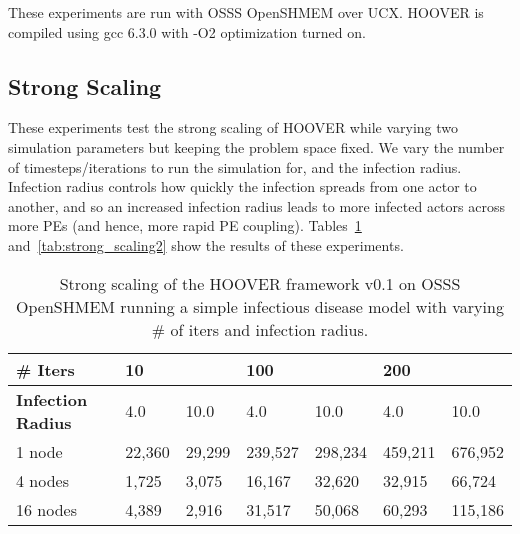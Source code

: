 These experiments are run with OSSS OpenSHMEM over UCX. HOOVER is compiled using
gcc 6.3.0 with -O2 optimization turned on.

\subsection{Strong Scaling}
\label{sec:strong_scaling}

These experiments test the strong scaling of HOOVER while varying two
simulation parameters but keeping the problem space fixed. We vary the number of
timesteps/iterations to run the simulation for, and the infection radius.
Infection radius controls how quickly the infection spreads from one actor to
another, and so an increased infection radius leads to more infected actors
across more PEs (and hence, more rapid PE coupling).
Tables~\ref{tab:strong_scaling1} and~\ref{tab:strong_scaling2} show the results of these experiments.

\begin{table}
\centering
\begin{tabularx}{\textwidth}{ | l || X | X | X | X | X | X | }
\hline
\textbf{\# Iters}           & \multicolumn{2}{|X|}{\textbf{10}} & \multicolumn{2}{|X|}{\textbf{100}} & \multicolumn{2}{|X|}{\textbf{200}} \\\hline
\textbf{Infection Radius}   & 4.0          & 10.0         & 4.0           & 10.0          & 4.0           & 10.0 \\\hline
1 node                      & 22,360 & 29,299 & 239,527 & 298,234 & 459,211 & 676,952 \\\hline
4 nodes                     & 1,725  & 3,075  & 16,167  & 32,620  & 32,915  & 66,724 \\\hline
16 nodes                    & 4,389  & 2,916  & 31,517  & 50,068  & 60,293  & 115,186 \\\hline
\end{tabularx}
\caption{Strong scaling of the HOOVER framework v0.1 on OSSS OpenSHMEM running a
    simple infectious disease model with varying \# of iters and infection
    radius.}
\label{tab:strong_scaling1}
\end{table}

